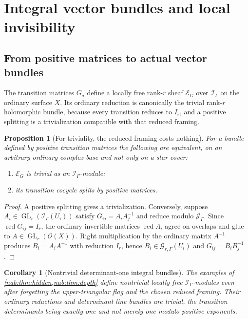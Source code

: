 \documentclass[11pt,letterpaper]{article}
\newtheorem{proposition}[proposition]{Proposition}
\newtheorem{corollary}[corollary]{Corollary}
\theoremstyle{definition}
\theoremstyle{remark}
\newcommand{\OO}{\mathcal O}
\newcommand{\II}{\mathscr I_\Gamma}
\newcommand{\JJ}{\mathscr J_\Gamma}
\newcommand{\GG}{\mathscr G_{r,\Gamma}}
\newcommand{\GL}{\operatorname{GL}}
\newcommand{\red}{\operatorname{red}}
\numberwithin{equation}{section}
\begin{document}
\section{Integral vector bundles and local invisibility}
\label{nab:sec:bundles}

\subsection{From positive matrices to actual vector bundles}

The transition matrices $G_a$ define a locally free rank-$r$ sheaf
$\mathcal E_G$ over $\II$ on the ordinary surface $X$. Its ordinary reduction
is canonically the trivial rank-$r$ holomorphic bundle, because every
transition reduces to $I_r$, and a positive splitting is a trivialization
compatible with that reduced framing.

\begin{proposition}[For triviality, the reduced framing costs nothing]
\label{nab:prop:integraltrivial}
For a bundle defined by positive transition matrices the following are
equivalent, on an arbitrary ordinary complex base and not only on a star
cover:
\begin{enumerate}[label=\textup{(\roman*)}]
\item $\mathcal E_G$ is trivial as an $\II$-module;
\item its transition cocycle splits by positive matrices.
\end{enumerate}
\end{proposition}

\begin{proof}
A positive splitting gives a trivialization. Conversely, suppose
$A_i\in\GL_r(\II(U_i))$ satisfy $G_{ij}=A_iA_j^{-1}$ and reduce modulo $\JJ$.
Since $\red G_{ij}=I_r$, the ordinary invertible matrices $\red A_i$ agree on
overlaps and glue to $A\in\GL_r(\OO(X))$. Right multiplication by the ordinary
matrix $A^{-1}$ produces $B_i=A_iA^{-1}$ with reduction $I_r$, hence
$B_i\in\GG(U_i)$ and $G_{ij}=B_iB_j^{-1}$.
\end{proof}

\begin{corollary}[Nontrivial determinant-one integral bundles]
\label{nab:cor:nontrivialbundles}
The examples of \cref{nab:thm:hidden,nab:thm:depth} define nontrivial locally
free $\II$-modules even after forgetting the upper-triangular flag and the
chosen reduced framing. Their ordinary reductions and determinant line bundles
are trivial, the transition determinants being exactly one and not merely one
modulo positive exponents.
\end{corollary}
\end{document}
